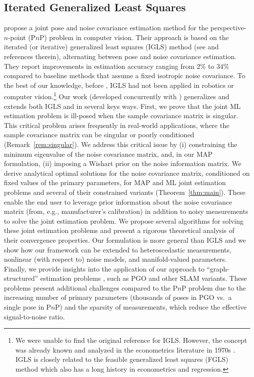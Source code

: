 \subsection{Iterated Generalized Least Squares}
\citet{zhan2025generalized} propose a joint pose and noise
covariance estimation method for the perspective-$n$-point (P$n$P) problem in
computer vision. Their approach is based on the iterated (or iterative)
generalized least squares (IGLS) method (see \cite[Chapter
12.5]{SeberWild200309} and references therein), alternating between pose
and noise covariance estimation. They report improvements in
estimation accuracy
ranging from $2\%$ to $34\%$ compared to baseline methods that assume a fixed
isotropic noise covariance.
To the best of our knowledge, before \cite{zhan2025generalized}, IGLS had not been
applied in robotics or computer vision.\footnote{We were
unable to find the original reference for IGLS. However, the concept was already known
and analyzed in the econometrics literature in 1970s
\cite{malinvaud1980statistical}. IGLS is closely
related to the feasible generalized least squares (FGLS) method which also has a
long history in econometrics and regression.}
Our work (developed concurrently with
\cite{zhan2025generalized}) generalizes and extends both IGLS and 
\cite{zhan2025generalized} in several keys ways.
First, we prove that the joint ML estimation problem is ill-posed when the sample covariance
matrix is singular. This critical problem arises frequently in
real-world applications, where the sample covariance matrix can be singular or
poorly conditioned (Remark~\ref{rem:singular}). We address this critical issue by
(i) constraining the minimum eigenvalue of the noise covariance matrix, and, in our MAP formulation, (ii) imposing a Wishart prior on the noise information
matrix. We derive analytical optimal solutions for the noise
covariance matrix, conditioned on fixed values of the primary parameters, for MAP
and ML joint estimation problems and several of their constrained variants
(Theorem~\ref{thm:main}). These enable the end user to leverage prior information
about the noise covariance matrix (from, e.g., manufacturer's calibration) in
addition to noisy measurements to solve the joint estimation problem. We propose several algorithms for
solving these joint estimation problems and present a rigorous theoretical
analysis of their convergence properties.  Our formulation is more general than
IGLS and we show how our framework can be extended to heteroscedastic
measurements, nonlinear (with respect to) noise models, and manifold-valued
parameters.  Finally, we provide insights into the application of our approach
to ``graph-structured'' estimation problems \cite{khosoussi2019reliable}, such
as PGO and other SLAM variants. These problems present
additional challenges compared to the P$n$P problem due to the increasing number
of primary parameters (thousands of poses in PGO vs.\ a single pose in P$n$P) and
the sparsity of measurements, which reduce the effective signal-to-noise ratio.


